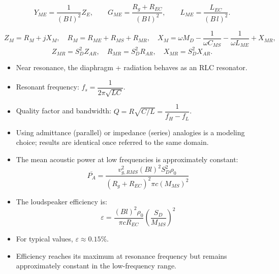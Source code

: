 \begin{tcolorbox}[colback=gray!5,colframe=gray!50!black,title=Key relations]
\[
Y_{ME}=\frac{1}{(B\,l)^2}Z_E,\qquad
G_{ME}=\frac{R_g+R_{EC}}{(B\,l)^2},\qquad
L_{ME}=\frac{L_{EC}}{(B\,l)^2}.
\]
\end{tcolorbox}


\begin{tcolorbox}[colback=gray!5,colframe=gray!50!black,title=Key formulas]
\[
Z_M=R_M+jX_M,\quad
R_M=R_{ME}+R_{MS}+R_{MR},\quad
X_M=\omega M_D-\frac{1}{\omega C_{MS}}-\frac{1}{\omega L_{ME}}+X_{MR},
\]
\[
Z_{MR}=S_D^{2}Z_{AR},\quad
R_{MR}=S_D^{2}R_{AR},\quad
X_{MR}=S_D^{2}X_{AR}.
\]
\end{tcolorbox}

\begin{tcolorbox}[colback=gray!5,colframe=gray!50!black,title=Key points]
\begin{itemize}
\item Near resonance, the diaphragm + radiation behaves as an RLC resonator.
\item Resonant frequency: \( f_s=\dfrac{1}{2\pi\sqrt{LC}} \).
\item Quality factor and bandwidth: \( Q=R\sqrt{C/L}=\dfrac{1}{f_H-f_L} \).
\item Using admittance (parallel) or impedance (series) analogies is a modeling choice; results are identical once referred to the same domain.
\end{itemize}
\end{tcolorbox}


\begin{tcolorbox}[colback=gray!10!white,colframe=black,title=\textbf{Summary – Loudspeaker Efficiency}]
\begin{itemize}
    \item The mean acoustic power at low frequencies is approximately constant:
    \[
    \overline{P_A} = \frac{v_{g,RMS}^2 (B l)^2 S_D^2 \rho_0}{(R_g + R_{EC})^2 \pi c (M_{MS})^2}
    \]
    \item The loudspeaker efficiency is:
    \[
    \varepsilon = \frac{(B l)^2 \rho_0}{\pi c R_{EC}} \left( \frac{S_D}{M_{MS}} \right)^2
    \]
    \item For typical values, \(\varepsilon \approx 0.15\%\).
    \item Efficiency reaches its maximum at resonance frequency but remains approximately constant in the low-frequency range.
\end{itemize}
\end{tcolorbox}



